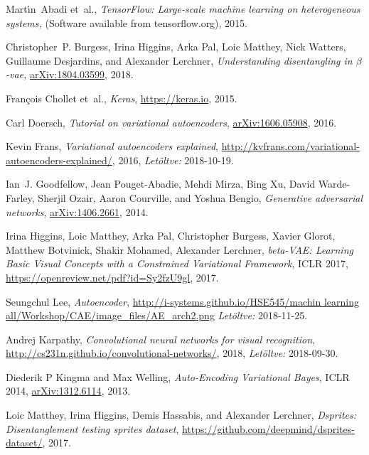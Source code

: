 \begin{thebibliography}{99}

Mart\'{\i}n~Abadi et~al., \textit{{TensorFlow}: Large-scale machine learning on heterogeneous systems,} (Software available from tensorflow.org),  2015.

Christopher~P. Burgess, Irina Higgins, Arka Pal, Loic Matthey, Nick Watters,
  Guillaume Desjardins, and Alexander Lerchner, 
\textit{Understanding disentangling in $\beta$-vae,}
\url{arXiv:1804.03599}, 2018.

Fran\c{c}ois Chollet et~al.,
\newblock \textit{Keras},
\newblock \url{https://keras.io}, 2015.

Carl Doersch,
\newblock \textit{Tutorial on variational autoencoders},
\newblock \url{arXiv:1606.05908}, 2016.



Kevin Frans,
\newblock \textit{Variational autoencoders explained},
\newblock \url{http://kvfrans.com/variational-autoencoders-explained/}, 2016,
\newblock \textsl{Let\"oltve:} 2018-10-19.

Ian~J. Goodfellow, Jean Pouget-Abadie, Mehdi Mirza, Bing Xu, David
  Warde-Farley, Sherjil Ozair, Aaron Courville, and Yoshua Bengio,
\newblock \textit{Generative adversarial networks},
\newblock \url{arXiv:1406.2661}, 2014.

Irina Higgins, Loic Matthey, Arka Pal, Christopher Burgess, Xavier Glorot, Matthew Botvinick, Shakir Mohamed, Alexander Lerchner, \textit{beta-VAE: Learning Basic Visual Concepts with a Constrained Variational Framework}, ICLR 2017,
\url{https://openreview.net/pdf?id=Sy2fzU9gl}, 2017.




Seungchul Lee, \textit{Autoencoder},
\url{http://i-systems.github.io/HSE545/machin learning all/Workshop/CAE/image_files/AE_arch2.png} \newblock \textsl{Let\"oltve:} 2018-11-25.

Andrej Karpathy,
\newblock \textit{Convolutional neural networks for visual recognition},
\newblock \url{http://cs231n.github.io/convolutional-networks/}, 2018,
\newblock \textsl{Let\"oltve:} 2018-09-30.

Diederik P Kingma and Max Welling,
\textit{Auto-Encoding Variational Bayes}, ICLR 2014,
\url{arXiv:1312.6114}, 2013.

Loic Matthey, Irina Higgins, Demis Hassabis, and Alexander Lerchner,
\newblock\textit{ Dsprites: Disentanglement testing sprites dataset},
\newblock \url{https://github.com/deepmind/dsprites-dataset/}, 2017.

\end{thebibliography}

